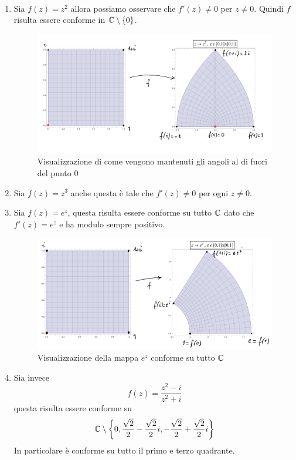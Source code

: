 \begin{example}\
  \begin{enumerate}
    \item Sia $f(z) = z^2$ allora possiamo osservare che $f'(z) \neq 0$ per $z
      \neq 0$. Quindi $f$ risulta essere conforme in $\mathbb{C} \setminus \left\{ 0
      \right\}$.
      \begin{figure}[h]
        \centering
        \includegraphics[width=0.6\linewidth]{images/analisi_complessa/es_mappa_conforme2.png}
        \caption{Visualizzazione di come vengono mantenuti gli angoli al di
        fuori del punto $0$}
        \label{fig:mappe_conformi_esempio1}
      \end{figure}
    \item Sia $f(z) = z^3$ anche questa è tale che $f'(z) \neq 0$ per ogni $z
      \neq 0$.
    \item Sia $f(z) = e^z$, questa risulta essere conforme su tutto $\mathbb{C}$ dato
      che $f'(z) = e^z$ e ha modulo sempre positivo. 
      \begin{figure}[h]
        \centering
        \includegraphics[width=0.6\linewidth]{images/analisi_complessa/es_mappa_conforme4.png}
        \caption{Visualizzazione della mappa $e^z$ conforme su tutto $\mathbb{C}$}
        \label{fig:mappe_conformi_esempio3}
      \end{figure}
    \item Sia invece
      \begin{equation*}
        f(z) = \frac{z^2 - i}{z^2 + i} 
      \end{equation*}
      questa risulta essere conforme su 
      \begin{equation*}
        \mathbb{C} \setminus \left\{ 0, \frac{\sqrt{2}}{2} - \frac{\sqrt{2}}{2}i,
        -\frac{\sqrt{2}}{2} + \frac{\sqrt{2}}{2}i \right\}
      \end{equation*}
      In particolare è conforme su tutto il primo e terzo quadrante.


\end{enumerate}
\end{example}
